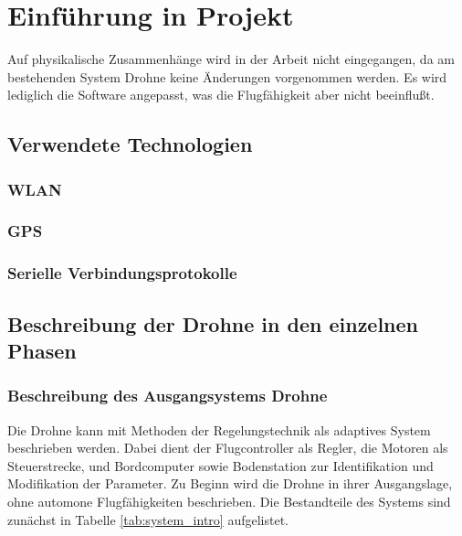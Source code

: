 \chapter{Einführung in Projekt}
Auf physikalische Zusammenhänge wird in der Arbeit nicht eingegangen, da am bestehenden System Drohne keine Änderungen vorgenommen werden. Es wird lediglich die Software angepasst, was die Flugfähigkeit aber nicht beeinflußt.

\section{Verwendete Technologien}
\subsection{WLAN}
\subsection{GPS}
\subsection{Serielle Verbindungsprotokolle}

\section{Beschreibung der Drohne in den einzelnen Phasen}
\subsection{Beschreibung des Ausgangsystems Drohne}
Die Drohne kann mit Methoden der Regelungstechnik als adaptives System beschrieben werden. Dabei dient der Flugcontroller als Regler, die Motoren als Steuerstrecke, und Bordcomputer sowie Bodenstation zur Identifikation und Modifikation der Parameter. Zu Beginn wird die Drohne in ihrer Ausgangslage, ohne automone Flugfähigkeiten beschrieben. Die Bestandteile des Systems sind zunächst in Tabelle \ref{tab:system_intro} aufgelistet.

